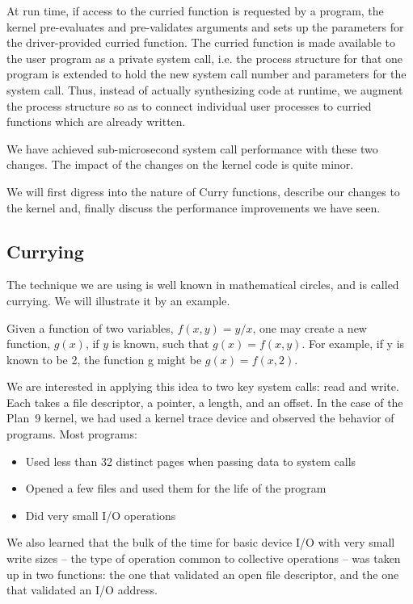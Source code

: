\documentclass[letterpaper]{article}
\begin{document}
At run time, if access to the curried function is requested by a program, 
the kernel  pre-evaluates and pre-validates arguments and sets up the parameters for the driver-provided curried function. 
The 
curried function is made available to the user program as a private system call, i.e. the process structure for 
that one program is extended to hold the new system call number and parameters for the system call. 
Thus, instead of actually synthesizing code at runtime, we augment the process structure so as to 
connect individual user processes to curried 
functions which are already written. 

We have achieved sub-microsecond system call performance with these two changes. The impact of the 
changes on the kernel code is quite minor. 

We will first digress into the nature of Curry functions, describe our changes to the kernel and, finally discuss the 
performance improvements we have seen. 

\subsection{Currying}
The technique we are using is well known in mathematical circles, and is called currying. 
We will illustrate it by an example. 

Given a function of two variables, $ f\left( x, y\right) = y/x$, 
one may create a new function, $g\left( x\right)$, 
if $y$ is known,  such that $g\left( x\right) = f\left( x, y\right)$. 
For example, if y is known to be 2, the function g might be $g\left( x\right) = f\left( x, 2\right)$. 

We are interested in applying this idea to two key system calls: read and write. Each takes a 
file descriptor, a pointer, a length, and an offset. 
In the case of the Plan~9 kernel, we had used a kernel trace device and observed the 
behavior of programs. Most programs: 
\begin{itemize}
\item Used less than 32 distinct pages when passing data to system calls
\item Opened a few files and used them for the life of the program
\item Did very small I/O operations
\end{itemize}

We also learned that the bulk of the time for basic device I/O with very small write sizes -- the type of operation common to collective operations -- was taken up in two functions: the one that validated an open file descriptor, and the one that validated an I/O address. 
\end{document}
